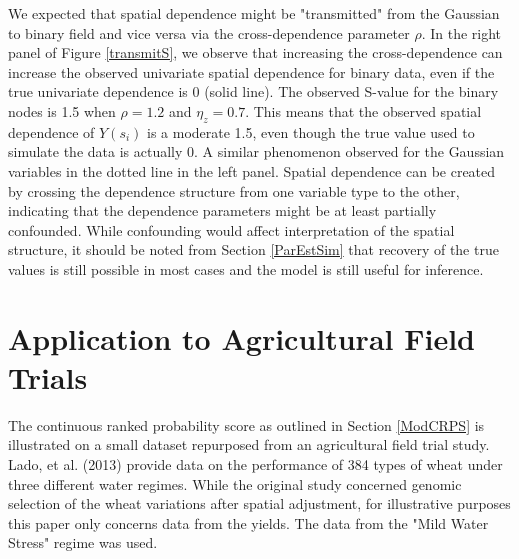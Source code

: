 \documentclass[12pt, a4paper, twoside]{article}
\begin{document}
We expected that spatial dependence might be "transmitted" from the Gaussian to binary field and vice versa via the cross-dependence parameter $\rho$. In the right panel of Figure \ref{transmitS}, we observe that increasing the cross-dependence can increase the observed univariate spatial dependence for binary data, even if the true univariate dependence is 0 (solid line). The observed S-value for the binary nodes is 1.5 when $\rho=1.2$ and $\eta_z=0.7$. This means that the observed spatial dependence of $Y(s_i)$ is a moderate 1.5, even though the true value used to simulate the data is actually 0. A similar phenomenon  observed for the Gaussian variables in the dotted line in the left panel. Spatial dependence can be created by crossing the dependence structure from one variable type to the other, indicating that the dependence parameters might be at least partially confounded. While confounding would affect interpretation of the spatial structure, it should be noted from Section \ref{ParEstSim} that recovery of the true values is still possible in most cases and the model is still useful for inference.

\section{Application to Agricultural Field Trials} \label{AgTrials}
The continuous ranked probability score as outlined in Section \ref{ModCRPS} is illustrated on a small dataset repurposed from an agricultural field trial study. Lado, et al. (2013) provide data on the performance of 384 types of wheat under three different water regimes. While the original study concerned genomic selection of the wheat variations after spatial adjustment, for illustrative purposes this paper only concerns data from the yields. The data from the "Mild Water Stress" regime was used.
\end{document}
